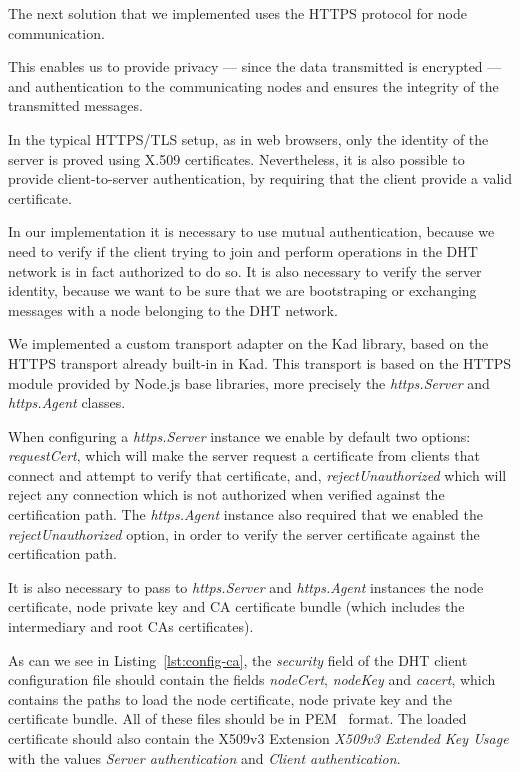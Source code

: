 The next solution that we implemented uses the HTTPS protocol for node communication.

This enables us to provide privacy — since the data transmitted is encrypted — and authentication to the communicating nodes and ensures the integrity of the transmitted messages.

In the typical HTTPS/TLS setup, as in web browsers, only the identity of the server is proved using X.509 certificates.
Nevertheless, it is also possible to provide client-to-server authentication, by requiring that the client provide a valid certificate.

In our implementation it is necessary to use mutual authentication, because we need to verify if the client trying to join and perform operations in the DHT network is in fact authorized to do so.
It is also necessary to verify the server identity, because we want to be sure that we are bootstraping or exchanging messages with a node belonging to the DHT network.

We implemented a custom transport adapter on the Kad library, based on the HTTPS transport already built-in in Kad.
This transport is based on the HTTPS module provided by Node.js base libraries, more precisely the \textit{https.Server} and \textit{https.Agent} classes.

When configuring a \textit{https.Server} instance we enable by default two options: \textit{requestCert}, which will make the server request a certificate from clients that connect and attempt to verify that certificate, and, \textit{rejectUnauthorized} which will reject any connection which is not authorized when verified against the certification path.
The \textit{https.Agent} instance also required that we enabled the \textit{rejectUnauthorized} option, in order to verify the server certificate against the certification path.

It is also necessary to pass to \textit{https.Server} and \textit{https.Agent} instances the node certificate, node private key and CA certificate bundle (which includes the intermediary and root CAs certificates).

As can we see in Listing~\ref{lst:config-ca}, the \textit{security} field of the DHT client configuration file should contain the fields \textit{nodeCert}, \textit{nodeKey} and \textit{cacert}, which contains the paths to load the node certificate, node private key and the certificate bundle.
All of these files should be in \ac{PEM}~\cite{rfc1421} format.
The loaded certificate should also contain the X509v3 Extension \textit{X509v3 Extended Key Usage} with the values \textit{Server authentication} and \textit{Client authentication}.


